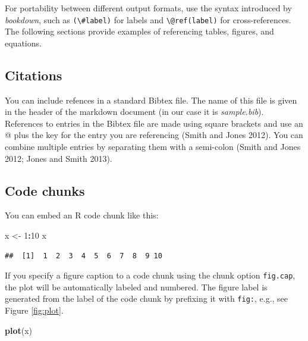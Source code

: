 \documentclass[9pt,a4paper,]{extarticle}
\newenvironment{Shaded}{\begin{snugshade}}{\end{snugshade}}
\newcommand{\KeywordTok}[1]{\textcolor[rgb]{0.13,0.29,0.53}{\textbf{#1}}}
\newcommand{\DecValTok}[1]{\textcolor[rgb]{0.00,0.00,0.81}{#1}}
\newcommand{\StringTok}[1]{\textcolor[rgb]{0.31,0.60,0.02}{#1}}
\newcommand{\OperatorTok}[1]{\textcolor[rgb]{0.81,0.36,0.00}{\textbf{#1}}}
\newcommand{\NormalTok}[1]{#1}
\theoremstyle{definition}
\theoremstyle{definition}
\theoremstyle{definition}
\theoremstyle{remark}
\begin{document}
For portability between different output formats, use the syntax
introduced by \emph{bookdown}, such as
\texttt{(\textbackslash{}\#label)} for labels and
\texttt{\textbackslash{}@ref(label)} for cross-references. The following
sections provide examples of referencing tables, figures, and equations.

\subsection{Citations}\label{citations}

You can include refences in a standard Bibtex file. The name of this
file is given in the header of the markdown document (in our case it is
\emph{sample.bib}). References to entries in the Bibtex file are made
using square brackets and use an @ plus the key for the entry you are
referencing (Smith and Jones 2012). You can combine multiple entries by
separating them with a semi-colon (Smith and Jones 2012; Jones and Smith
2013).

\subsection{Code chunks}\label{code-chunks}

You can embed an R code chunk like this:

\begin{Shaded}
\begin{Highlighting}[]
\NormalTok{x <-}\StringTok{ }\DecValTok{1}\OperatorTok{:}\DecValTok{10}
\NormalTok{x}
\end{Highlighting}
\end{Shaded}

\begin{verbatim}
##  [1]  1  2  3  4  5  6  7  8  9 10
\end{verbatim}

If you specify a figure caption to a code chunk using the chunk option
\texttt{fig.cap}, the plot will be automatically labeled and numbered.
The figure label is generated from the label of the code chunk by
prefixing it with \texttt{fig:}, e.g., see Figure \ref{fig:plot}.

\begin{Shaded}
\begin{Highlighting}[]
\KeywordTok{plot}\NormalTok{(x)}
\end{Highlighting}
\end{Shaded}
\end{document}
